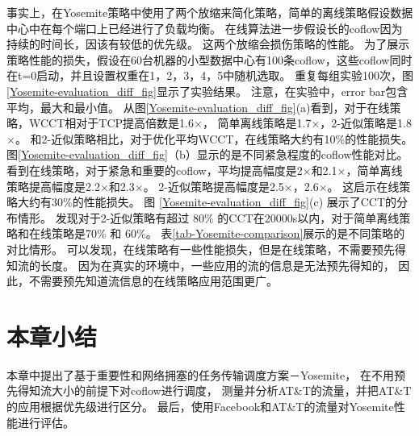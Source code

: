 事实上，在Yosemite策略中使用了两个放缩来简化策略，简单的离线策略假设数据中心中在每个端口上已经进行了负载均衡。
在线算法进一步假设长的coflow因为持续的时间长，因该有较低的优先级。
这两个放缩会损伤策略的性能。
为了展示策略性能的损失，假设在60台机器的小型数据中心有100条coflow，这些coflow同时在t=0启动，并且设置权重在1，2，3，4，5中随机选取。
重复每组实验100次，图\ref{Yosemite-evaluation_diff_fig}显示了实验结果。
注意，在实验中，error bar包含平均，最大和最小值。
从图\ref{Yosemite-evaluation_diff_fig}(a)看到，对于在线策略，WCCT相对于TCP提高倍数是1.6$\times$，
简单离线策略是1.7$\times$，2-近似策略是1.8$\times$。
和2-近似策略相比，对于优化平均WCCT，在线策略大约有10\%的性能损失。
图\ref{Yosemite-evaluation_diff_fig}（b）显示的是不同紧急程度的coflow性能对比。
看到在线策略，对于紧急和重要的coflow，平均提高幅度是2$\times$和2.1$\times$，简单离线策略提高幅度是2.2$\times$和2.3$\times$。
2-近似策略提高幅度是2.5$\times$，2.6$\times$。
这启示在线策略大约有30\%的性能损失。
图 \ref{Yosemite-evaluation_diff_fig}(c) 展示了CCT的分布情形。
发现对于2-近似策略有超过 80\% 的CCT在20000s以内，对于简单离线策略和在线策略是70\% 和 60\%。
表\ref{tab-Yosemite-comparison}展示的是不同策略的对比情形。
可以发现，在线策略有一些性能损失，但是在线策略，不需要预先得知流的长度。
因为在真实的环境中，一些应用的流的信息是无法预先得知的，
因此，不需要预先知道流信息的在线策略应用范围更广。


\section{本章小结}
本章中提出了基于重要性和网络拥塞的任务传输调度方案－Yosemite，
在不用预先得知流大小的前提下对coflow进行调度，
测量并分析AT\&T的流量，并把AT\&T的应用根据优先级进行区分。
最后，使用Facebook和AT\&T的流量对Yosemite性能进行评估。


